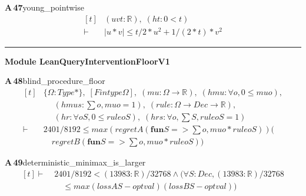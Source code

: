 \documentclass[conference]{IEEEtran}
\theoremstyle{definition}
\newcommand{\lean}[1]{\textsf{\footnotesize #1}}
\begin{document}
\noindent\textbf{A\,47}\quad\lean{young\_pointwise}
{\footnotesize\[ \begin{aligned}[t]
&(\mathit{u} \mathit{v} \mathit{t} : \mathbb{R} ),\; (\mathit{ht} : 0 < \mathit{t})\\
\vdash\;&|\mathit{u} * \mathit{v}| \leq \mathit{t} / 2 * \mathit{u} ^{2} + 1 / (2 * \mathit{t}) * \mathit{v} ^{2}
\end{aligned} \]}

\vspace{4pt}\noindent\rule{\columnwidth}{0.4pt}\par\vspace{2pt}
\noindent\textbf{Module \lean{LeanQueryInterventionFloorV1}}\par\vspace{3pt}

\noindent\textbf{A\,48}\quad\lean{blind\_procedure\_floor}
{\footnotesize\[ \begin{aligned}[t]
&\{ \Omega : \mathit{Type}*\},\; [\mathit{Fintype} \Omega ],\; (\mathit{mu} : \Omega \to \mathbb{R} ),\; (\mathit{hmu} : \forall \mathit{o}, 0 \leq \mathit{mu} \mathit{o}),\\
&\quad \; (\mathit{hmus} : \textstyle\sum \mathit{o}, \mathit{mu} \mathit{o} = 1),\; (\mathit{rule} : \Omega \to \mathit{Dec} \to \mathbb{R} ),\\
&\quad \; (\mathit{hr} : \forall \mathit{o} \mathit{S}, 0 \leq \mathit{rule} \mathit{o} \mathit{S}),\; (\mathit{hrs} : \forall \mathit{o}, \textstyle\sum \mathit{S}, \mathit{rule} \mathit{o} \mathit{S} = 1)\\
\vdash\;&2401/8192 \leq \mathit{max} (\mathit{regretA} (\mathbf{fun} \mathit{S} => \textstyle\sum \mathit{o}, \mathit{mu} \mathit{o}*\mathit{rule} \mathit{o} \mathit{S})) (\\
&\quad \mathit{regretB} (\mathbf{fun} \mathit{S} => \textstyle\sum \mathit{o}, \mathit{mu} \mathit{o}*\mathit{rule} \mathit{o} \mathit{S}))
\end{aligned} \]}

\noindent\textbf{A\,49}\quad\lean{deterministic\_minimax\_is\_larger}
{\footnotesize\[ \begin{aligned}[t]
\vdash\;&2401/8192 < (13983:\mathbb{R} )/32768 \wedge (\forall \mathit{S} : \mathit{Dec}, (13983:\mathbb{R} )/32768\\
&\quad \leq \mathit{max} (\mathit{lossA} \mathit{S} - \mathit{optval}) (\mathit{lossB} \mathit{S} - \mathit{optval}))
\end{aligned} \]}
\end{document}
